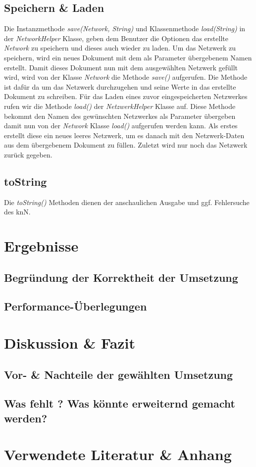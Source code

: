 \documentclass[paper=A4,pagesize=auto,12pt,headinclude=true,footinclude=true,BCOR=0mm,DIV=calc]{scrartcl}
\begin{document}
\subsection{Speichern \& Laden} %
Die Instanzmethode \textit{save(Network, String)} und Klassenmethode \textit{load(String)} in der \textit{NetworkHelper} Klasse, geben dem Benutzer die Optionen das erstellte \textit{Network} zu speichern und dieses auch wieder zu laden.
Um das Netzwerk zu speichern, wird ein neues Dokument mit dem als Parameter übergebenem Namen erstellt. Damit dieses Dokument nun mit dem ausgewählten Netzwerk gefüllt wird, wird von der Klasse \textit{Network} die Methode \textit{save()} aufgerufen. Die Methode ist dafür da um das Netzwerk durchzugehen und seine Werte in das
erstellte Dokument zu schreiben. Für das Laden eines zuvor eingespeicherten Netzwerkes rufen wir die Methode \textit{load()} der \textit{NetzwerkHelper} Klasse auf. Diese Methode bekommt den Namen des gewünschten Netzwerkes als Parameter übergeben damit nun von der \textit{Network} Klasse \textit{load()} aufgerufen werden kann. Als erstes erstellt diese ein neues leeres Netzwerk, um es danach mit den Netzwerk-Daten aus dem übergebenem Dokument zu füllen. Zuletzt wird nur noch das Netzwerk zurück gegeben.


\subsection{toString}
Die \textit{toString()} Methoden dienen der anschaulichen Ausgabe und ggf. Fehlersuche des knN. 

\newpage

\section{Ergebnisse}

\subsection{Begründung der Korrektheit der Umsetzung}

\subsection{Performance-Überlegungen}

\newpage

\section{Diskussion \& Fazit}

\subsection{Vor- \& Nachteile der gewählten Umsetzung}

\subsection{Was fehlt ? Was könnte erweiternd gemacht werden?}

\newpage

\section{Verwendete Literatur \& Anhang}
\end{document}
